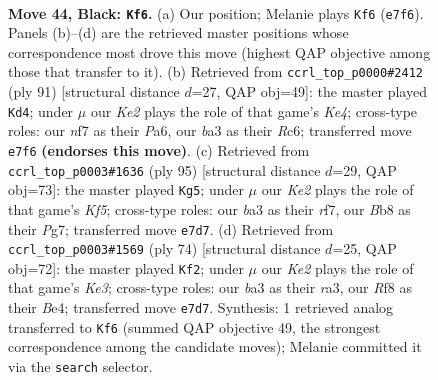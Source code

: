 \documentclass[11pt]{article}
\begin{document}
\clearpage

\begin{figure}[p]\centering
\begin{subfigure}{0.46\textwidth}\centering
\resizebox{\linewidth}{!}{%
\newchessgame
\chessboard[
  setfen={1b3r2/p3kN2/P5P1/1P3p2/8/B7/3K4/R7 b - - 1 44},
  showmover=false,
  pgfstyle=straightmove, color=movearrow, markmove={e7-f6}
]}
\caption{}
\end{subfigure}\hfill
\begin{subfigure}{0.46\textwidth}\centering
\resizebox{\linewidth}{!}{%
\newchessgame
\chessboard[
  setfen={8/8/p1r5/2N1kb1p/1P6/P3R3/6PK/8 b - - 3 46},
  showmover=false,
  pgfstyle=straightmove, color=movearrow, markmove={e5-d4}
]}
\caption{}
\end{subfigure}
\\[4pt]
\begin{subfigure}{0.46\textwidth}\centering
\resizebox{\linewidth}{!}{%
\newchessgame
\chessboard[
  setfen={8/5Rp1/8/2p4P/4bkN1/1P5K/2r5/8 b - - 3 48},
  showmover=false,
  pgfstyle=straightmove, color=movearrow, markmove={f4-g5}
]}
\caption{}
\end{subfigure}\hfill
\begin{subfigure}{0.46\textwidth}\centering
\resizebox{\linewidth}{!}{%
\newchessgame
\chessboard[
  setfen={8/5k2/8/p5pR/1n2B3/r3K1PP/8/8 w - - 1 38},
  showmover=false,
  pgfstyle=straightmove, color=movearrow, markmove={e3-f2}
]}
\caption{}
\end{subfigure}
\caption{\textbf{Move 44, Black: \texttt{Kf6}.} (a) Our position; Melanie plays \texttt{Kf6} (\texttt{e7f6}). Panels (b)--(d) are the retrieved master positions whose correspondence most drove this move (highest QAP objective among those that transfer to it). (b) Retrieved from \texttt{ccrl\_top\_p0000\#2412} (ply 91) [structural distance $d$=27, QAP obj=49]: the master played \texttt{Kd4}; under $\mu$ our \emph{Ke2} plays the role of that game's \emph{Ke4}; cross-type roles: our \emph{n}f7 as their \emph{P}a6, our \emph{b}a3 as their \emph{R}c6; transferred move \texttt{e7f6} \textbf{(endorses this move)}. (c) Retrieved from \texttt{ccrl\_top\_p0003\#1636} (ply 95) [structural distance $d$=29, QAP obj=73]: the master played \texttt{Kg5}; under $\mu$ our \emph{Ke2} plays the role of that game's \emph{Kf5}; cross-type roles: our \emph{b}a3 as their \emph{r}f7, our \emph{B}b8 as their \emph{P}g7; transferred move \texttt{e7d7}. (d) Retrieved from \texttt{ccrl\_top\_p0003\#1569} (ply 74) [structural distance $d$=25, QAP obj=72]: the master played \texttt{Kf2}; under $\mu$ our \emph{Ke2} plays the role of that game's \emph{Ke3}; cross-type roles: our \emph{b}a3 as their \emph{r}a3, our \emph{R}f8 as their \emph{B}e4; transferred move \texttt{e7d7}. Synthesis: 1 retrieved analog transferred to \texttt{Kf6} (summed QAP objective 49, the strongest correspondence among the candidate moves); Melanie committed it via the \texttt{search} selector.}
\label{fig:thought-m87}
\end{figure}
\end{document}
